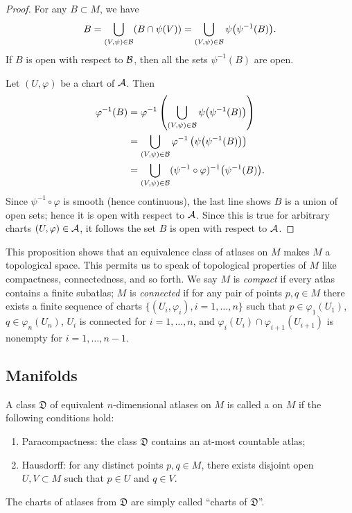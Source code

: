 \begin{proof}
  For any $B\subset M$, we have
  \begin{equation}
B = \bigcup_{(V,\psi)\in\mathcal{B}}(B\cap\psi(V))
  = \bigcup_{(V,\psi)\in\mathcal{B}}\psi\bigl(\psi^{-1}(B)\bigr).
  \end{equation}
If $B$ is open with respect to $\mathcal{B}$, then all the sets
$\psi^{-1}(B)$ are open.

Let $(U,\varphi)$ be a chart of $\mathcal{A}$. Then
\begin{subequations}
\begin{align}
\varphi^{-1}(B)
&=\varphi^{-1}\left(\bigcup_{(V,\psi)\in\mathcal{B}}\psi\bigl(\psi^{-1}(B)\bigr)\right)\\
&= \bigcup_{(V,\psi)\in\mathcal{B}}\varphi^{-1}\left(\psi\bigl(\psi^{-1}(B)\bigr)\right)\\
&= \bigcup_{(V,\psi)\in\mathcal{B}} (\psi^{-1}\circ\varphi)^{-1}\bigl(\psi^{-1}(B)\bigr).
\end{align}
\end{subequations}
Since $\psi^{-1}\circ\varphi$ is smooth (hence continuous), the last
line shows $B$ is a union of open sets; hence it is open with respect to
$\mathcal{A}$. Since this is true for arbitrary charts $(U,\varphi)\in\mathcal{A}$,
it follows the set $B$ is open with respect to $\mathcal{A}$.
\end{proof}

\begin{remark}
This proposition shows that an equivalence class of atlases on $M$ makes
$M$ a topological space. This permits us to speak of topological
properties of $M$ like compactness, connectedness, and so forth.
We say $M$ is \emph{compact} if every atlas contains a finite subatlas;
$M$ is \emph{connected} if for any pair of points $p,q\in M$ there
exists a finite sequence of charts $\{(U_{i},\varphi_{i}),i=1,\dots,n\}$
such that $p\in\varphi_{1}(U_{1})$, $q\in\varphi_{n}(U_{n})$, $U_{i}$ is
connected for $i=1,\dots,n$, and $\varphi_{i}(U_{i})\cap\varphi_{i+1}(U_{i+1})$
is nonempty for $i=1,\dots,n-1$.
\end{remark}

\subsection{Manifolds}

\begin{definition}
A class $\mathfrak{D}$ of equivalent $n$-dimensional atlases on $M$ is
called a  on $M$ if the following
conditions hold:
\begin{enumerate}
\item Paracompactness: the class $\mathfrak{D}$ contains an at-most countable atlas;
\item Hausdorff: for any distinct points $p,q\in M$, there exists
  disjoint open $U,V\subset M$ such that $p\in U$ and $q\in V$.
\end{enumerate}
The charts of atlases from $\mathfrak{D}$ are simply called ``charts of $\mathfrak{D}$''.
\end{definition}

